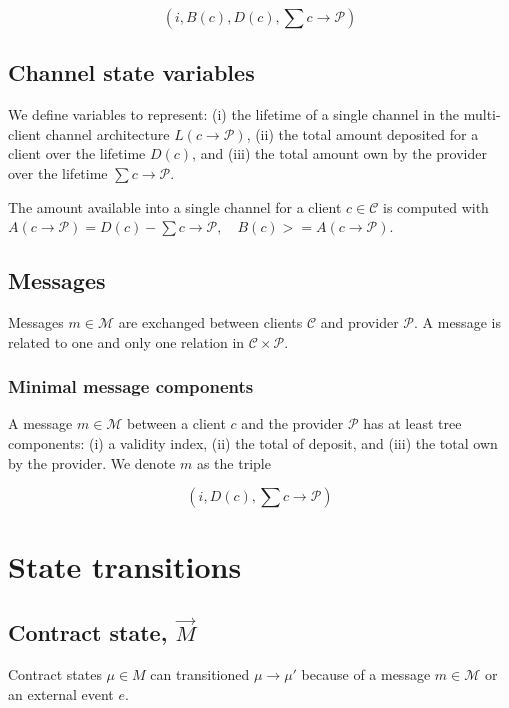 \documentclass{llncs}
\begin{document}
$$(i, B(c), D(c), \textstyle \sum c \rightarrow \mathcal{P})$$

\subsection{Channel state variables} We define variables to represent: (i) the lifetime of a single channel in the multi-client channel architecture $L(c \rightarrow \mathcal{P})$, (ii) the total amount deposited for a client over the lifetime $D(c)$, and (iii) the total amount own by the provider over the lifetime $\sum c \rightarrow \mathcal{P}$.

The amount available into a single channel for a client $c \in \mathcal{C}$ is computed with $A(c \rightarrow \mathcal{P}) = D(c) - \sum c \rightarrow \mathcal{P}, \quad B(c) >= A(c \rightarrow \mathcal{P})$.


\subsection{Messages} Messages $m \in \mathcal{M}$ are exchanged between clients $\mathcal{C}$ and provider $\mathcal{P}$. A message is related to one and only one relation in $\mathcal{C} \times \mathcal{P}$.

\subsubsection{Minimal message components} A message $m \in \mathcal{M}$ between a client $c$ and the provider $\mathcal{P}$ has at least tree components: (i) a validity index, (ii) the total of deposit, and (iii) the total own by the provider. We denote $m$ as the triple

$$(i, D(c), \textstyle \sum c \rightarrow \mathcal{P})$$

\section{State transitions}

\subsection{Contract state, $\overrightarrow{M}$} Contract states $\mu \in M$ can transitioned $\mu \rightarrow \mu'$ because of a message $m \in \mathcal{M}$ or an external event $e$.
\end{document}
